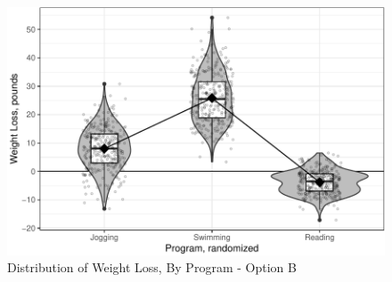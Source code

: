\documentclass[
]{article}
\begin{document}
\begin{figure}[hb]

\includegraphics{Appendix_ex_weightloss_files/figure-latex/unnamed-chunk-31-1} \hfill{}

\caption{Distribution of Weight Loss, By Program - Option B}\label{fig:unnamed-chunk-31}
\end{figure}

\clearpage
\end{document}
